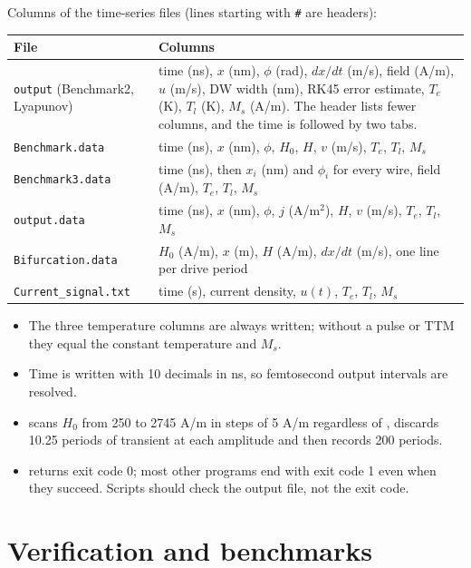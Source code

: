 \documentclass[11pt,a4paper]{report}
\newcommand{\key}[1]{\texttt{\detokenize{#1}}}
\begin{document}
Columns of the time-series files (lines starting with \texttt{\#} are headers):
\begin{center}\small
\begin{tabularx}{\textwidth}{@{}l X@{}}
\toprule File & Columns\\\midrule
\texttt{output} (Benchmark2, Lyapunov) & time (ns), $x$ (nm), $\phi$ (rad), $dx/dt$ (m/s), field (A/m), $u$ (m/s), DW width (nm), RK45 error estimate, $T_e$ (K), $T_l$ (K), $M_s$ (A/m). The header lists fewer columns, and the time is followed by two tabs.\\
\texttt{Benchmark.data} & time (ns), $x$ (nm), $\phi$, $H_0$, $H$, $v$ (m/s), $T_e$, $T_l$, $M_s$\\
\texttt{Benchmark3.data} & time (ns), then $x_i$ (nm) and $\phi_i$ for every wire, field (A/m), $T_e$, $T_l$, $M_s$\\
\texttt{output.data} & time (ns), $x$ (nm), $\phi$, $j$ (A/m$^2$), $H$, $v$ (m/s), $T_e$, $T_l$, $M_s$\\
\texttt{Bifurcation.data} & $H_0$ (A/m), $x$ (m), $H$ (A/m), $dx/dt$ (m/s), one line per drive period\\
\texttt{Current\_signal.txt} & time (s), current density, $u(t)$, $T_e$, $T_l$, $M_s$\\
\bottomrule
\end{tabularx}
\end{center}
\begin{itemize}
\item The three temperature columns are always written; without a pulse or TTM they equal the constant temperature and $M_s$.
\item Time is written with 10 decimals in ns, so femtosecond output intervals are resolved.
\item \key{Bifurcation} scans $H_0$ from 250 to 2745 A/m in steps of 5 A/m regardless of \key{H}, discards 10.25 periods of transient at each amplitude and then records 200 periods.
\item \key{Benchmark2} returns exit code 0; most other programs end with exit code 1 even when they succeed. Scripts should check the output file, not the exit code.
\end{itemize}

\chapter{Verification and benchmarks}\label{ch:verification}
\end{document}
